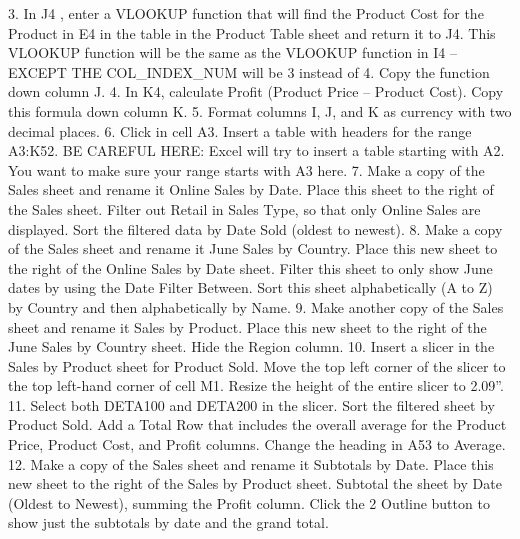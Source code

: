 3. In J4 , enter a VLOOKUP function that will find the Product Cost for the Product in E4 in the
table in the Product Table sheet and return it to J4. This VLOOKUP function will be the same as
the VLOOKUP function in I4 – EXCEPT THE COL_INDEX_NUM will be 3 instead of 4. Copy
the function down column J.
4. In K4, calculate Profit (Product Price – Product Cost). Copy this formula down column K.
5. Format columns I, J, and K as currency with two decimal places.
6. Click in cell A3. Insert a table with headers for the range A3:K52. BE CAREFUL HERE: Excel
will try to insert a table starting with A2. You want to make sure your range starts with A3 here.
7. Make a copy of the Sales sheet and rename it Online Sales by Date. Place this sheet to the right
of the Sales sheet. Filter out Retail in Sales Type, so that only Online Sales are displayed. Sort the
filtered data by Date Sold (oldest to newest).
8. Make a copy of the Sales sheet and rename it June Sales by Country. Place this new sheet to the
right of the Online Sales by Date sheet. Filter this sheet to only show June dates by using the
Date Filter Between. Sort this sheet alphabetically (A to Z) by Country and then alphabetically
by Name.
9. Make another copy of the Sales sheet and rename it Sales by Product. Place this new sheet to
the right of the June Sales by Country sheet. Hide the Region column.
10. Insert a slicer in the Sales by Product sheet for Product Sold. Move the top left corner of the
slicer to the top left-hand corner of cell M1. Resize the height of the entire slicer to 2.09”.
11. Select both DETA100 and DETA200 in the slicer. Sort the filtered sheet by Product Sold. Add a
Total Row that includes the overall average for the Product Price, Product Cost, and Profit
columns. Change the heading in A53 to Average.
12. Make a copy of the Sales sheet and rename it Subtotals by Date. Place this new sheet to the
right of the Sales by Product sheet. Subtotal the sheet by Date (Oldest to Newest), summing the
Profit column. Click the 2 Outline button to show just the subtotals by date and the grand total.


